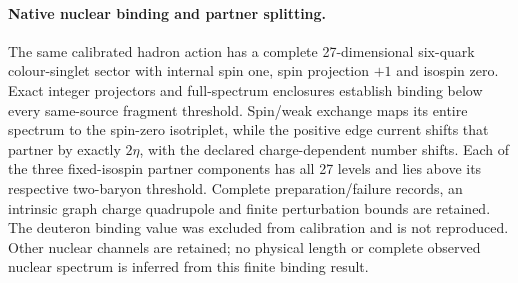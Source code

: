 \paragraph{Native nuclear binding and partner splitting.}
The same calibrated hadron action has a complete 27-dimensional six-quark
colour-singlet sector with internal spin one, spin projection $+1$ and
isospin zero. Exact integer
projectors and full-spectrum enclosures establish binding below every
same-source fragment threshold. Spin/weak exchange maps its entire spectrum
to the spin-zero isotriplet, while the positive edge current shifts that
partner by exactly $2\eta$, with the declared charge-dependent number shifts.
Each of the three fixed-isospin partner components has all 27 levels and
lies above its respective two-baryon threshold.
Complete preparation/failure records, an intrinsic graph charge quadrupole
and finite perturbation bounds are retained. The deuteron binding value was
excluded from calibration and is not reproduced. Other nuclear channels
are retained; no physical length or complete observed nuclear spectrum is
inferred from this finite binding result.
